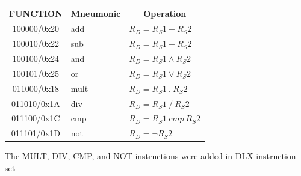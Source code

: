 \documentclass{article}
\begin{document}
  \FloatBarrier
  \begin{table}[H]
    \begin{center}
      \begin{tabular}[pos]{| c | l | l |} \hline 	
      \multicolumn{1}{|c|}{\cellcolor[gray]{0.9}\textbf{FUNCTION}} & 
      \multicolumn{1}{c|}{\cellcolor[gray]{0.9}\textbf{Mneumonic}} & 
      \multicolumn{1}{c|}{\cellcolor[gray]{0.9}\textbf{Operation}} \\ \hline
	 100000/0x20 	& add & $R_D = R_S1 + R_S2$ \\ \hline
	 100010/0x22 	& sub & $R_D = R_S1 - R_S2$ \\ \hline
	 100100/0x24 	& and & $R_D = R_S1 \land R_S2$ \\ \hline
	 100101/0x25 & or & $R_D = R_S1 \lor R_S2$ \\ \hline
	 011000/0x18 & mult & $R_D = R_S1 ~.~ R_S2$ \\ \hline
	 011010/0x1A & div & $R_D = R_S1 ~/~ R_S2$ \\ \hline
	 011100/0x1C & cmp & $R_D = R_S1 ~cmp~ R_S2$ \\ \hline
	 011101/0x1D & not & $R_D = \lnot R_S2$ \\ \hline

      \end{tabular}
    \end{center}
  \end{table} 

The MULT, DIV, CMP, and NOT instructions were added in DLX instruction set
\end{document}

